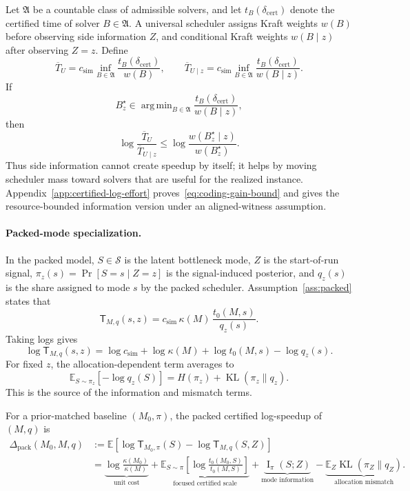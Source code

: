 \documentclass{article}
\DeclareMathOperator*{\argmin}{arg\,min}
\DeclareMathOperator{\KL}{KL}
\DeclareMathOperator{\MI}{I}
\newcommand{\cS}{\mathcal{S}}
\newcommand{\E}{\mathbb{E}}
\begin{document}
Let \(\mathfrak A\) be a countable class of admissible solvers, and let
\(t_B(\delta_{\mathrm{cert}})\) denote the certified time of solver \(B\in\mathfrak A\).
A universal scheduler assigns Kraft weights \(w(B)\) before observing side information
\(Z\), and conditional Kraft weights \(w(B\mid z)\) after observing \(Z=z\).  Define
\[
    \overline T_U
    =
    c_{\mathrm{sim}}
    \inf_{B\in\mathfrak A}
    \frac{t_B(\delta_{\mathrm{cert}})}{w(B)},
    \qquad
    \overline T_{U\mid z}
    =
    c_{\mathrm{sim}}
    \inf_{B\in\mathfrak A}
    \frac{t_B(\delta_{\mathrm{cert}})}{w(B\mid z)} .
\]
If
\[
    B_z^\star
    \in
    \argmin_{B\in\mathfrak A}
    \frac{t_B(\delta_{\mathrm{cert}})}{w(B\mid z)},
\]
then
\begin{equation}
\label{eq:coding-gain-bound}
    \log\frac{\overline T_U}{\overline T_{U\mid z}}
    \le
    \log\frac{w(B_z^\star\mid z)}{w(B_z^\star)} .
\end{equation}
Thus side information cannot create speedup by itself; it helps by moving scheduler mass
toward solvers that are useful for the realized instance.  Appendix~\ref{app:certified-log-effort}
proves~\eqref{eq:coding-gain-bound} and gives the resource-bounded information version
under an aligned-witness assumption.

\paragraph{Packed-mode specialization. }
In the packed model, \(S\in\cS\) is the latent bottleneck mode, \(Z\) is the start-of-run
signal, \(\pi_z(s)=\Pr[S=s\mid Z=z]\) is the signal-induced posterior, and \(q_z(s)\)
is the share assigned to mode \(s\) by the packed scheduler.  Assumption~\ref{ass:packed}
states that
\[
    \mathsf T_{M,q}(s,z)
    =
    c_{\mathrm{sim}}\,
    \kappa(M)\,
    \frac{t_0(M,s)}{q_z(s)} .
\]
Taking logs gives
\[
    \log \mathsf T_{M,q}(s,z)
    =
    \log c_{\mathrm{sim}}
    +
    \log\kappa(M)
    +
    \log t_0(M,s)
    -
    \log q_z(s).
\]
For fixed \(z\), the allocation-dependent term averages to
\[
    \E_{S\sim\pi_z}[-\log q_z(S)]
    =
    H(\pi_z)+\KL(\pi_z\|q_z).
\]
This is the source of the information and mismatch terms.

For a prior-matched baseline \((M_0,\pi)\), the packed certified log-speedup of
\((M,q)\) is
\begin{equation}
\label{eq:four-term-prior}
\begin{aligned}
    \Delta_{\mathrm{pack}}(M_0,M,q)
    &:=
    \E\!\left[
        \log \mathsf T_{M_0,\pi}(S)
        -
        \log \mathsf T_{M,q}(S,Z)
    \right]
    \\
    &=
    \underbrace{\log\frac{\kappa(M_0)}{\kappa(M)}}_{\text{unit cost}}
    +
    \underbrace{
    \E_{S\sim\pi}
    \left[
        \log\frac{t_0(M_0,S)}{t_0(M,S)}
    \right]
    }_{\text{focused certified scale}}
    +
    \underbrace{\MI_\pi(S;Z)}_{\text{mode information}}
    -
    \underbrace{\E_Z\KL(\pi_Z\|q_Z)}_{\text{allocation mismatch}} .
\end{aligned}
\end{equation}
\end{document}
